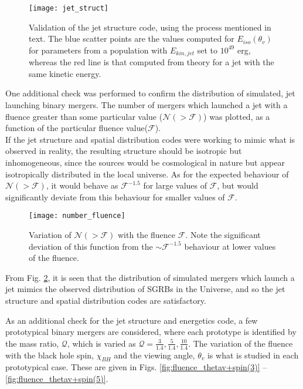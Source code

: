     \begin{figure}[H]
        \centering
        \texttt{[image: jet\_struct]}
        \caption[Validation of the jet structure code]
        {
            Validation of the jet structure code, using the process mentioned in text.
            The blue scatter points are the values computed for $E_{iso}(\theta_v)$ for
            parameters from a population with $E_{kin, jet}$ set to $10^{49}$ erg,
            whereas the red line is that computed from theory for a jet with the same
            kinetic energy.
        }
        \label{fig:jet_struct}
    \end{figure}

    One additional check was performed to confirm the distribution of simulated, jet
    launching binary mergers. The number of mergers which launched a jet with a fluence
    greater than some particular value ($\mathcal{N}(>\mathcal{F})$) was plotted, as a
    function of the particular fluence value($\mathcal{F}$).\\
    If the jet structure and spatial distribution codes were working to mimic what is
    observed in reality, the resulting structure should be isotropic but inhomogeneous,
    since the sources would be cosmological in nature but appear isotropically
    distributed in the local universe. As for the expected behaviour of $\mathcal{N}(>
    \mathcal{F})$, it would behave as $\mathcal{F}^{-1.5}$ for large values of
    $\mathcal{F}$, but would significantly deviate from this behaviour
    for smaller values of $\mathcal{F}$.

    \begin{figure}[H]
        \centering
        \texttt{[image: number\_fluence]}
        \caption[Variation of $\mathcal{N}(> \mathcal{F})$ with $\mathcal{F}$]{
            Variation of $\mathcal{N}(> \mathcal{F})$ with the fluence $\mathcal{F}$.
            Note the significant deviation of this function from the $\sim
            \mathcal{F}^{-1.5}$ behaviour at lower values of the fluence.
        }
        \label{fig:number_fluence}
    \end{figure}

    From Fig. \ref{fig:number_fluence}, it is seen that the distribution of simulated
    mergers which launch a jet mimics the observed distribution of SGRBs in the
    Universe, and so the jet structure and spatial distribution codes are satisfactory.

    As an additional check for the jet structure and energetics code, a few prototypical
    binary mergers are considered, where each prototype is identified by the mass ratio,
    $\mathcal{Q}$, which is varied as $\mathcal{Q} = \frac{3}{1.4}, \frac{5}{1.4},
    \frac{10}{1.4}$. The variation of the fluence with the black hole spin, $\chi_{BH}$
    and the viewing angle, $\theta_v$ is what is studied in each prototypical case.
    These are given in Figs. \ref{fig:fluence_thetav+spin(3)} --
    \ref{fig:fluence_thetav+spin(5)}.

